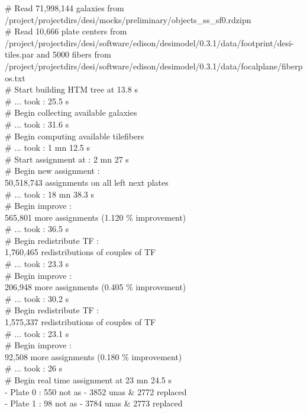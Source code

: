 \documentclass{article}
\begin{document}
{\tt \small 

\noindent\# Read 71,998,144 galaxies from /project/projectdirs/desi/mocks/preliminary/objects\_ss\_sf0.rdzipn \\
\# Read 10,666 plate centers from /project/projectdirs/desi/software/edison/desimodel/0.3.1/data/footprint/desi-tiles.par and 
5000 fibers from /project/projectdirs/desi/software/edison/desimodel/0.3.1/data/focalplane/fiberpos.txt \\
\# Start building HTM tree at 13.8 s \\
\# ... took : 25.5 s \\
\# Begin collecting available galaxies \\
 \# ... took : 31.6 s \\
\# Begin computing available tilefibers \\
\# ... took : 1 mn 12.5 s \\
\# Start assignment at :  2 mn 27 s \\
\# Begin new assignment : \\
  50,518,743 assignments on all left next plates \\
\# ... took : 18 mn 38.3 s \\
\# Begin improve : \\
  565,801 more assignments (1.120 \% improvement) \\
\# ... took : 36.5 s \\
\# Begin redistribute TF : \\
  1,760,465 redistributions of couples of TF \\
\# ... took : 23.3 s \\
\# Begin improve : \\
  206,948 more assignments (0.405 \% improvement) \\
\# ... took : 30.2 s \\
\# Begin redistribute TF : \\
  1,575,337 redistributions of couples of TF \\
\# ... took : 23.1 s \\
\# Begin improve : \\
  92,508 more assignments (0.180 \% improvement) \\
\# ... took : 26 s \\
\# Begin real time assignment at 23 mn 24.5 s \\
 - Plate 0 :   550 not as -  3852 unas \& 2772 replaced \\
 - Plate 1 :    98 not as -  3784 unas \& 2773 replaced \\
}
\end{document}
